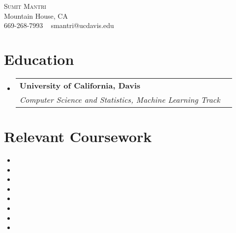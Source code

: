 \documentclass[letterpaper,11pt]{article}
\makeatletter
\newcommand{\resumeSubheading}[4]{
  \vspace{-2pt}\item
  \begin{tabular*}{1.0\textwidth}[t]{l@{\extracolsep{\fill}}r}
    \textbf{#1} & \textbf{\small #2} \\
    \textit{\small#3} & \textit{\small #4} \\
  \end{tabular*}\vspace{-7pt}
}
\newcommand{\resumeSubHeadingListStart}{\begin{itemize}[leftmargin=0.0in, label={}]}
\newcommand{\resumeSubHeadingListEnd}{\end{itemize}}
\makeatother
\begin{document}
\begin{center}
    {\Huge \scshape Sumit Mantri} \\[1pt]
    Mountain House, CA \\[1pt]
    \small 669-268-7993 ~ smantri@ucdavis.edu ~  ~ 
\end{center}

\section{Education}
\resumeSubHeadingListStart
  \resumeSubheading
    {University of California, Davis}{}
    {Computer Science and Statistics, Machine Learning Track}{}
\resumeSubHeadingListEnd

\section{Relevant Coursework}
\begin{multicols}{4}
    \begin{itemize}[itemsep=-5pt, parsep=3pt]
        \item 
        \item 
        \item 
        \item 
        \item 
        \item 
        \item 
        \item 
    \end{itemize}
\end{multicols}

\end{document}
